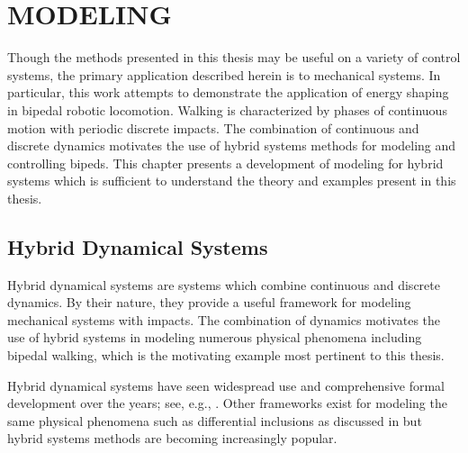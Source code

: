 \chapter{\uppercase{Modeling}} \label{ch:modeling}

Though the methods presented in this thesis may be useful on a variety of
control systems, the primary application described herein is to mechanical
systems.
%
In particular, this work attempts to demonstrate the application of energy
shaping in bipedal robotic locomotion.
%
Walking is characterized by phases of continuous motion with periodic discrete
impacts.
%
The combination of continuous and discrete dynamics motivates the use of hybrid
systems methods for modeling and controlling bipeds.
%
This chapter presents a development of modeling for hybrid systems which is
sufficient to understand the theory and examples present in this thesis.
%

\section{Hybrid Dynamical Systems}

Hybrid dynamical systems are systems which combine continuous and discrete
dynamics.
%
By their nature, they provide a useful framework for modeling mechanical systems
with impacts.
%
The combination of dynamics motivates the use of hybrid systems in modeling
numerous physical phenomena including bipedal walking, which is the motivating
example most pertinent to this thesis.
%

Hybrid dynamical systems have seen widespread use and comprehensive formal
development over the years;
%
see, e.g., \cite{Branicky1998, Goebel2009, Grizzle2014, Schaft2000,
  Westervelt2007}.
%
Other frameworks exist for modeling the same physical phenomena such as
differential inclusions as discussed in \cite{Filippov1988} but hybrid systems
methods are becoming increasingly popular.

